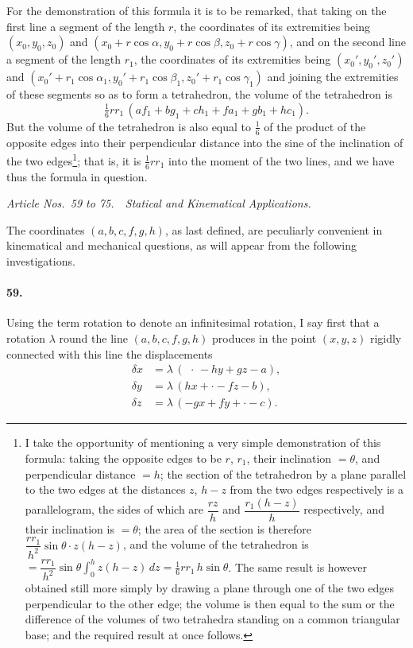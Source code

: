 \documentclass[11pt,a4paper]{article}
\begin{document}
For the demonstration of this formula it is to be remarked, that taking on the
first line a segment of the length $r$, the coordinates of its extremities being
$(x_0, y_0, z_0)$ and $(x_0 + r\cos\alpha, y_0 + r\cos\beta, z_0 + r\cos\gamma)$,
and on the second line a segment of the length $r_1$, the coordinates of its extremities
being $(x_0', y_0', z_0')$ and $(x_0' + r_1 \cos\alpha_1, y_0' + r_1 \cos\beta_1, z_0' + r_1 \cos\gamma_1)$
and joining the extremities of these segments so as to form a tetrahedron, the volume
of the tetrahedron is
\[
\tfrac{1}{6} rr_1\,(af_1 + bg_1 + ch_1 + fa_1 + gb_1 + hc_1).
\]
But the volume of the tetrahedron is also equal to $\tfrac{1}{6}$ of the product of the
opposite edges into their perpendicular distance into the sine of the inclination of
the two edges\footnote{I take the opportunity of mentioning a very simple demonstration
of this formula: taking the opposite edges to be $r$, $r_1$, their inclination $= \theta$,
and perpendicular distance $= h$; the section of the tetrahedron by a plane parallel to
the two edges at the distances $z$, $h-z$ from the two edges respectively is a
parallelogram, the sides of which are $\dfrac{rz}{h}$ and $\dfrac{r_1(h-z)}{h}$
respectively, and their inclination is $= \theta$; the area of the section is therefore
$\dfrac{rr_1}{h^2}\sin\theta\cdot z(h-z)$, and the volume of the tetrahedron is
$= \dfrac{rr_1}{h^2}\sin\theta \int_0^h z(h-z)\,dz = \tfrac{1}{6} rr_1\,h\sin\theta$. The
same result is however obtained still more simply by drawing a plane through one of
the two edges perpendicular to the other edge; the volume is then equal to the sum
or the difference of the volumes of two tetrahedra standing on a common triangular
base; and the required result at once follows.}; that is, it is $\tfrac{1}{6} rr_1$
into the moment of the two lines, and we have thus the formula in question.

\bigskip
\begin{center}
\textit{Article Nos.\ 59 to 75.\ \ Statical and Kinematical Applications.}
\end{center}

The coordinates $(a,b,c,f,g,h)$, as last defined, are peculiarly convenient in
kinematical and mechanical questions, as will appear from the following investigations.

\paragraph{59.}
Using the term rotation to denote an infinitesimal rotation, I say first that
a rotation $\lambda$ round the line $(a,b,c,f,g,h)$ produces in the point $(x,y,z)$ rigidly
connected with this line the displacements
\begin{align*}
\delta x &= \lambda\,(\ \,\cdot\, - hy + gz - a), \\
\delta y &= \lambda\,(hx + \cdot - fz - b), \\
\delta z &= \lambda\,(-gx + fy + \cdot - c).
\end{align*}
\end{document}
